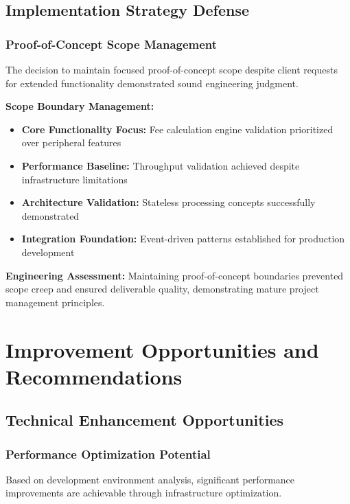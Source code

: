 \subsection{Implementation Strategy Defense}

\subsubsection{Proof-of-Concept Scope Management}

The decision to maintain focused proof-of-concept scope despite client requests for extended functionality demonstrated sound engineering judgment.

\textbf{Scope Boundary Management:}
\begin{itemize}
    \item \textbf{Core Functionality Focus:} Fee calculation engine validation prioritized over peripheral features
    \item \textbf{Performance Baseline:} Throughput validation achieved despite infrastructure limitations
    \item \textbf{Architecture Validation:} Stateless processing concepts successfully demonstrated
    \item \textbf{Integration Foundation:} Event-driven patterns established for production development
\end{itemize}

\textbf{Engineering Assessment:}
Maintaining proof-of-concept boundaries prevented scope creep and ensured deliverable quality, demonstrating mature project management principles.

\section{Improvement Opportunities and Recommendations}

\subsection{Technical Enhancement Opportunities}

\subsubsection{Performance Optimization Potential}

Based on development environment analysis, significant performance improvements are achievable through infrastructure optimization.

